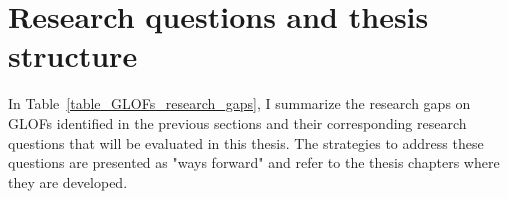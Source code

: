 


\section{Research questions and thesis structure}


In Table~\ref{table_GLOFs_research_gaps}, I summarize the research gaps on GLOFs identified in the previous sections and their corresponding research questions that will be evaluated in this thesis. The strategies to address these questions are presented as "ways forward" and refer to the thesis chapters where they are developed.




